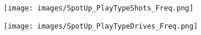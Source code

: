 \documentclass[a4paper,12pt]{article}
\begin{document}
\begin{table}[H]
    \centering
    \begin{minipage}[c]{0.45\textwidth} %
        \centering
        \texttt{[image: images/SpotUp\_PlayTypeShots\_Freq.png]} %
    \end{minipage}
    \hfill %
    \begin{minipage}[c]{0.45\textwidth} %
        \centering
        \texttt{[image: images/SpotUp\_PlayTypeDrives\_Freq.png]} %
    \end{minipage}
\end{table}

\vspace{-1em} %
\vspace{-1em} %
\end{document}
